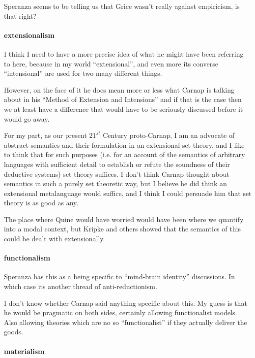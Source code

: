 \documentclass{article}
\begin{document}
Speranza seems to be telling us that Grice wasn't really against empiricism, is that right?
 
\paragraph{extensionalism}

I think I need to have a more precise idea of what he might have been referring to here, because in my world ``extensional'', and even more its converse ``intensional'' are used for two many different things.

However, on the face of it he does mean more or less what Carnap is talking about in his ``Method of Extension and Intensions'' and if that is the case then we at least have a difference that would have to be seriously discussed before it would go away.

For my part, as our present $21^{st}$ Century proto-Carnap, I am an advocate of abstract semantics and their formulation in an extensional set theory, and I like to think that for such purposes (i.e. for an account of the semantics of arbitrary languages with sufficient detail to establish or refute the soundness of their deductive systems) set theory suffices.
I don't think Carnap thought about semantics in such a purely set theoretic way, but I believe he did think an extensional metalanguage would suffice, and I think I could persuade him that set theory is as good as any.

The place where Quine would have worried would have been where we quantify into a modal context, but Kripke and others showed that the semantics of this could be dealt with extensionally.

\paragraph{functionalism}

Speranza has this as a being specific to ``mind-brain identity'' discussions.
In which case its another thread of anti-reductionism.

I don't know whether Carnap said anything specific about this.
My guess is that he would be pragmatic on both sides, certainly allowing functionalist models.
Also allowing theories which are no so ``functionalist'' if they actually deliver the goods.

\paragraph{materialism}
\end{document}
